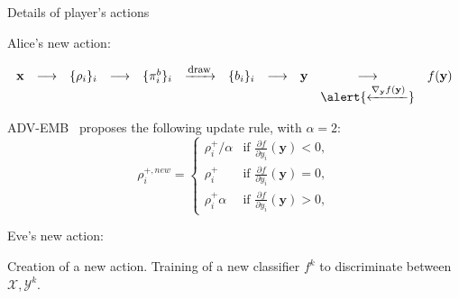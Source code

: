 \documentclass[10pt]{beamer}
\begin{document}
\begin{frame}{Details of player's actions}

    \alert{Alice's new action:}
    
     \begin{equation*}
            \begin{array}{ccccccccccc}
                \mathbf{x} & \longrightarrow & \{\rho_i\}_i & \longrightarrow & \{\pi_i^b\}_i &   \xrightarrow{\mbox{\footnotesize{draw}}} & \{b_i\}_i &  \longrightarrow & \mathbf{y} & \longrightarrow  & f(\mathbf{y}) \\
                & & & & & & & & & \alert{\xleftarrow{ \nabla_{\mathbf{y}} f(\mathbf{y}) }} 
            \end{array}
            \end{equation*}

ADV-EMB~\cite{tang2019cnn} proposes the following update rule, with $\alpha=2$:
\begin{equation}
\rho_{i}^{+, new} = 
\left\{
    \begin{array}{ll}
        \rho_{i}^+/\alpha & \mbox{if } \frac{\partial f}{\partial y_{i}}\left(\mathbf{y}\right) < 0, \\
        \rho_{i}^+ & \mbox{if } \frac{\partial f}{\partial y_{i}}\left(\mathbf{y}\right) = 0, \\
        \rho_{i}^+ \alpha & \mbox{if } \frac{\partial f}{\partial y_{i}}\left(\mathbf{y}\right) > 0,
    \end{array}
\right.
\label{eq:qplus}
\end{equation}

\pause
\alert{Eve's new action:}

 Creation of a new action. Training of a new classifier $f^k$ to discriminate between $\mathcal{X}, \mathcal{Y}^k$.


\end{frame}










\end{document}
